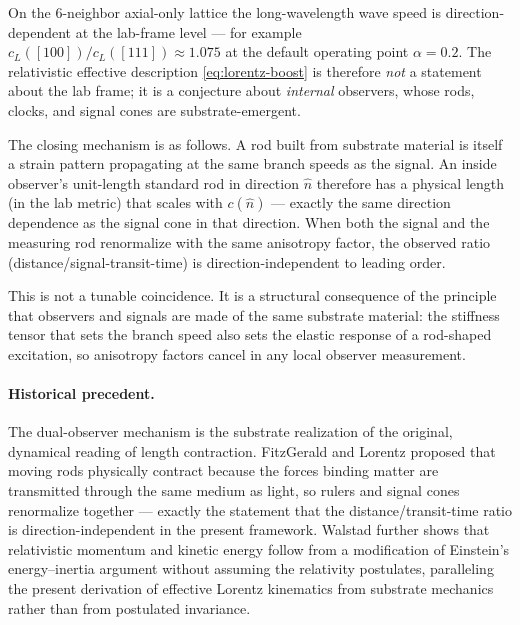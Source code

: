 On the 6-neighbor axial-only lattice the long-wavelength wave speed is direction-dependent at
the lab-frame level --- for example $c_L([100])/c_L([111])\approx 1.075$ at the default
operating point $\alpha=0.2$.
The relativistic effective description \eqref{eq:lorentz-boost} is therefore \emph{not} a
statement about the lab frame; it is a conjecture about \emph{internal} observers, whose rods,
clocks, and signal cones are substrate-emergent.

The closing mechanism is as follows.
A rod built from substrate material is itself a strain pattern propagating at the same branch
speeds as the signal.
An inside observer's unit-length standard rod in direction $\hat{n}$ therefore has a physical
length (in the lab metric) that scales with $c(\hat{n})$ --- exactly the same direction
dependence as the signal cone in that direction.
When both the signal and the measuring rod renormalize with the same anisotropy factor, the
observed ratio (distance/signal-transit-time) is direction-independent to leading order.

This is not a tunable coincidence.
It is a structural consequence of the principle that observers and signals are made of the same
substrate material: the stiffness tensor that sets the branch speed also sets the elastic
response of a rod-shaped excitation, so anisotropy factors cancel in any local observer
measurement.

\paragraph{Historical precedent.}
The dual-observer mechanism is the substrate realization of the original, dynamical reading of
length contraction.
FitzGerald \citep{FitzGerald1902} and Lorentz \citep{Lorentz1904} proposed that moving rods
physically contract because the forces binding matter are transmitted through the same medium as
light, so rulers and signal cones renormalize together --- exactly the statement that the
distance/transit-time ratio is direction-independent in the present framework.
Walstad \citep{Walstad2015} further shows that relativistic momentum and kinetic energy follow
from a modification of Einstein's energy--inertia argument \citep{Einstein1905inertia} without
assuming the relativity postulates, paralleling the present derivation of effective Lorentz
kinematics from substrate mechanics rather than from postulated invariance.

